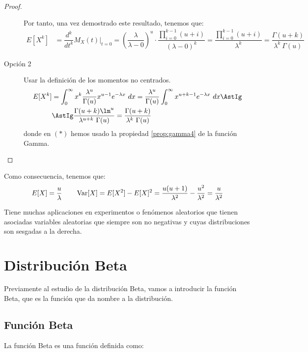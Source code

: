 \begin{proof}
\begin{description}
        Por tanto, una vez demostrado este resultado, tenemos que:
        \begin{align*}
            E[X^k] &= \dfrac{d^k}{dt^k} M_X(t) \Big|_{t=0}
            = \left(\dfrac{\lambda}{\lambda-0}\right)^u \cdot \dfrac{\prod\limits_{i=0}^{k-1}(u+i)}{(\lambda-0)^k}
            = \dfrac{\prod\limits_{i=0}^{k-1}(u+i)}{\lambda^k} = \dfrac{\Gamma(u+k)}{\lambda^k~\Gamma(u)}
        \end{align*}

        \item[Opción 2] Usar la definición de los momentos no centrados.
        \begin{align*}
            E[X^k] &= \int_{0}^{\infty} x^k \dfrac{\lambda^u}{\Gamma(u)}x^{u-1}e^{-\lambda x}~dx
            = \dfrac{\lambda^u}{\Gamma(u)} \int_{0}^{\infty} x^{u+k-1}e^{-\lambda x}~dx
            \AstIg \\ &\AstIg \dfrac{\Gamma(u+k)\lm^u}{\lambda^{u+k}~\Gamma(u)}
            = \dfrac{\Gamma(u+k)}{\lambda^k~\Gamma(u)}
        \end{align*}
        donde en $(\ast)$ hemos usado la propiedad \ref{prop:gamma4} de la función Gamma.
    \end{description}
\end{proof}

Como consecuencia, tenemos que:
\begin{equation*}
    E[X] = \dfrac{u}{\lambda} \qquad
    \operatorname{Var}[X] = E[X^2] - E[X]^2 = \dfrac{u(u+1)}{\lambda^2} - \dfrac{u^2}{\lambda^2} = \dfrac{u}{\lambda^2}
\end{equation*}


Tiene muchas aplicaciones en experimentos o fenómenos aleatorios que tienen asociadas variables aleatorias que siempre son no negativas
y cuyas distribuciones son sesgadas a la derecha.


\section{Distribución Beta}

Previamente al estudio de la distribución Beta, vamos a introducir la función Beta, que es la función que da nombre a la distribución.

\subsection{Función Beta}

\begin{definicion}
    La función Beta es una función definida como:
\end{definicion}


